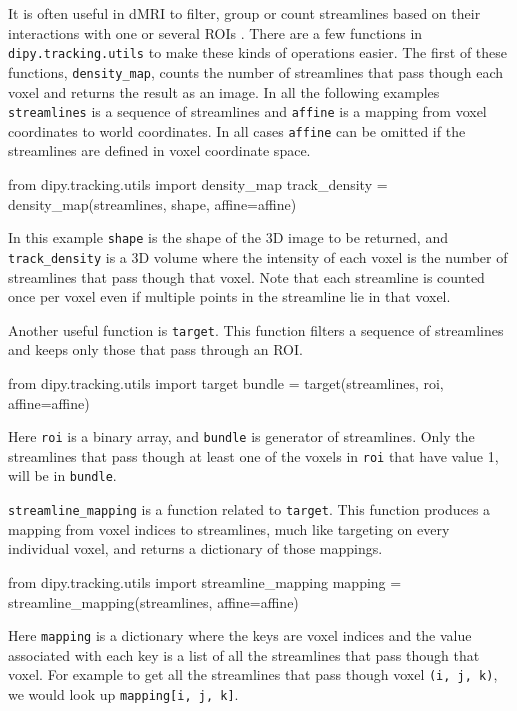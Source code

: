 \documentclass{bioinfo}
\begin{document}
It is often useful in dMRI to filter, group or count streamlines based on their
interactions with one or several ROIs \citep{Cote2013tractometer}. There are a few functions in
\texttt{dipy.tracking.utils} to make these kinds of operations easier. The
first of these functions, \texttt{density\_map}, counts the number of
streamlines that pass though each voxel and returns the result as an image. In
all the following examples \texttt{streamlines} is a sequence of streamlines and
\texttt{affine} is a mapping from voxel coordinates to world coordinates. In all
cases \texttt{affine} can be omitted if the streamlines
are defined in voxel coordinate space.
\begin{python}
from dipy.tracking.utils import density_map
track_density = density_map(streamlines, shape,
                            affine=affine)
\end{python}
In this example \texttt{shape} is the shape of the 3D image to be returned, and
\texttt{track\_density} is a 3D volume where the intensity of each voxel is the
number of streamlines that pass though that voxel. Note that
each streamline is counted once per voxel even if multiple points in the
streamline lie in that voxel.

Another useful function is \texttt{target}. This function filters a sequence of
streamlines and keeps only those that pass through an ROI.
\begin{python}
from dipy.tracking.utils import target
bundle = target(streamlines, roi, affine=affine)
\end{python}
Here \texttt{roi} is a binary array, and \texttt{bundle} is generator of
streamlines.  Only the streamlines that pass though at least
one of the voxels in \texttt{roi} that have value 1, will be in \texttt{bundle}.

\texttt{streamline\_mapping} is a function related to \texttt{target}. This
function produces a mapping from voxel indices to streamlines, much like targeting
on every individual voxel, and returns a dictionary of those mappings.
\begin{python}
from dipy.tracking.utils import streamline_mapping
mapping = streamline_mapping(streamlines,
                             affine=affine)
\end{python}
Here \texttt{mapping} is a dictionary where the keys are voxel indices and
the value associated with each key is a list of all the streamlines that pass though that voxel. For example to get all the
streamlines that pass though voxel \texttt{(i, j, k)}, we would look up
\texttt{mapping[i, j, k]}.
\end{document}
